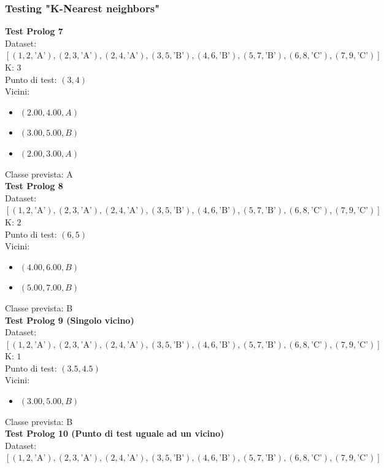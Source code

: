 \documentclass[11pt]{article}
\theoremstyle{definition}
\begin{document}
\subsubsection{Testing "K-Nearest neighbors"}
\textbf{Test Prolog 7}\\
Dataset: $[(1, 2, \text{'A'}), (2, 3, \text{'A'}), (2, 4, \text{'A'}), (3, 5, \text{'B'}), (4, 6, \text{'B'}), (5, 7, \text{'B'}), (6, 8, \text{'C'}), (7, 9, \text{'C'})]$\\
K: $3$\\
Punto di test: $(3, 4)$\\
Vicini:
\begin{itemize}
\item $(2.00,4.00, A)$
\item $(3.00,5.00, B)$
\item $(2.00,3.00, A)$
\end{itemize}
Classe prevista: A\\
\newline
\textbf{Test Prolog 8}\\
Dataset: $[(1, 2, \text{'A'}), (2, 3, \text{'A'}), (2, 4, \text{'A'}), (3, 5, \text{'B'}), (4, 6, \text{'B'}), (5, 7, \text{'B'}), (6, 8, \text{'C'}), (7, 9, \text{'C'})]$\\
K: $2$\\
Punto di test: $(6, 5)$\\
Vicini:
\begin{itemize}
\item $(4.00,6.00, B)$
\item $(5.00,7.00, B)$
\end{itemize}
Classe prevista: B\\
\newline
\textbf{Test Prolog 9 (Singolo vicino)}\\
Dataset: $[(1, 2, \text{'A'}), (2, 3, \text{'A'}), (2, 4, \text{'A'}), (3, 5, \text{'B'}), (4, 6, \text{'B'}), (5, 7, \text{'B'}), (6, 8, \text{'C'}), (7, 9, \text{'C'})]$\\
K: $1$\\
Punto di test: $(3.5, 4.5)$\\
Vicini:
\begin{itemize}
\item $(3.00,5.00, B)$
\end{itemize}
Classe prevista: B\\
\newline
\textbf{Test Prolog 10 (Punto di test uguale ad un vicino)}\\
Dataset: $[(1, 2, \text{'A'}), (2, 3, \text{'A'}), (2, 4, \text{'A'}), (3, 5, \text{'B'}), (4, 6, \text{'B'}), (5, 7, \text{'B'}), (6, 8, \text{'C'}), (7, 9, \text{'C'})]$\\
\end{document}
